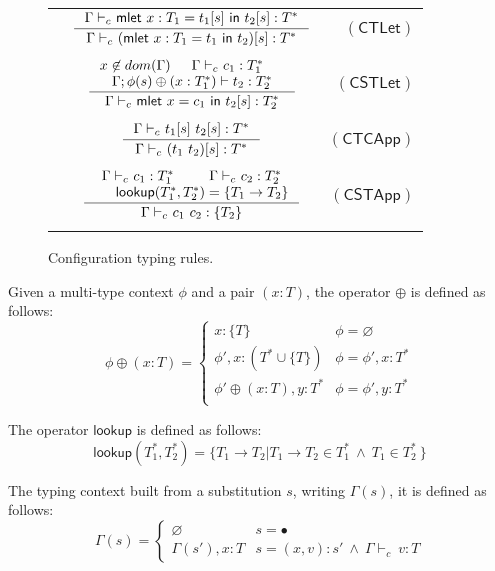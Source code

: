 \documentclass[preprint,authoryear,sort&compress,9pt,nocopyrightspace]{article}
\newcommand\rulename[1]{\mathsf{(#1)}}
\newcommand{\conf}[2][s]{(#2)[#1]}
\newcommand{\tyC}{{\Gamma \vdash_c \ }}
\newcommand{\oletP}[3]{\mathsf{mlet} \ x = #2 \ \mathsf{in}  \ #3}
\newcommand{\appD}{t_1 \ t_2}
\newcommand{\oletPT}[3]{\mathsf{mlet} \ x : #1 = #2 \ \mathsf{in}  \ #3}
\newcommand{\buscar}{\mathsf{lookup}}
\newcommand{\mtD}{T^{*}}
\newcommand{\mtP}[1]{#1^{*}}
\newcommand{\mtCu}[1]{\{ #1 \}}
\newcommand{\emt}{\phi}
\begin{document}
\begin{figure}
\begin{small}
\begin{center}
\begin{tabular}{|l c r|}
&$\inference{\tyC \oletPT{T_1}{t_1[s]}{t_2[s] : \mtP{T}}}{\tyC \conf{\oletPT{T_1}{t_1}{t_2}} : \mtP{T}}$&$\rulename{CTLet}$\\
&&\\
&$\inference{x \not \in dom(\Gamma) & \tyC c_1 : \mtP{T_1}  & \\ \Gamma ; \emt(s)  \oplus (x : T^{*}_1)  \vdash t_2 : \mtP{T_2}}{\tyC \oletP{T_1}{c_1}{t_2[s]} : \mtP{T_2}}$&$\rulename{CSTLet}$\\
&&\\
&$\inference {\tyC t_1[s] \ t_2[s] : \mtP{T}}{\tyC \conf{\appD} : \mtP{T}}$&$\rulename{CTCApp}$\\
&&\\
&$\inference {\tyC c_1 : T_1^{*} & \tyC c_2 : T_2^{*}  \\ & \buscar (T_1^{*}, T_2^{*}) = \{T_1 \to T_2\}}{\tyC c_1 \ c_2 : \{T_2\}}$&$\rulename{CSTApp}$\\
&&\\
\hline
\end{tabular}
\hspace*{-2.8cm}
\caption{Configuration typing rules.}
\label{tabla:confugurationtypingrule}
\end{center}

\end{small}
\end{figure}

\begin{definition}[$\oplus$]
\label{definition:tcs}
\mbox{}
Given a multi-type context $\emt$ and a pair $(x:T)$, the operator $\oplus$ is defined  as follows:
\[ \emt \oplus (x:T) = \begin{cases} 
      x:\mtCu{T}& \emt =  \varnothing \\
      \emt',x:(\mtD \cup \mtCu{T}) & \emt = \emt',x:\mtD\\
      \emt' \oplus (x:T),y:\mtD & \emt = \emt',y:\mtD\\
   \end{cases}
\]
\end{definition}


\begin{definition}[$\buscar$]
\label{definition:tcs}
\mbox{}
The operator $\buscar$ is defined  as follows:
\[ \buscar(T_1^{*}, T_2^{*}) =  
  \{T_1 \to T_2 | T_1 \to T_2 \in T_1^{*} \ \wedge \ T_1 \in T_2^{*} \ \}
\]
\end{definition}

\begin{definition}[$\Gamma(s)$]
\label{definition:tcs}
\mbox{}
The typing context built from a substitution $s$, writing $\Gamma(s)$, it is defined as follows:
\[ \Gamma(s) = \begin{cases} 
     \varnothing & s =  \bullet \\
      \Gamma(s'), x:T & s = (x,v):s' \ \land \ \tyC v : T 
   \end{cases}
\]
\end{definition}
\end{document}
